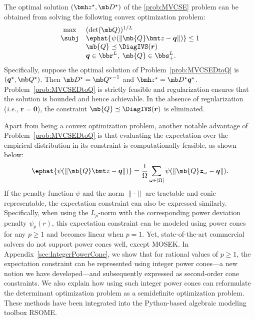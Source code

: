 \documentclass[mnsc, nonblindrev]{informswp}
\newcommand{\1}[1]{\mathds{1}{\left(#1\right)}}
\begin{document}
\begin{theorem}
\label{chap8:thm:MinimumVolumeDtoQ}
The optimal solution $(\bmh z^\star, \mb D^\star)$ of the \ref{prob:MVCSE} problem can be obtained from solving the following convex optimization problem:
\begin{equation}
\label{prob:MVCSEDtoQ}
\begin{array}{cll}
\max & (\det(\mb Q))^{1/L} \\
\subj & \ephat{\psi(\|\mb{Q} \bmt z - \bm q \|)} \leq 1 \\
& \mb{Q} \preceq \DiagIVS(\bm r) \\
& \bm q \in \bbr^L, \; \mb{Q} \in \bbs^{L}_{+}.  
\end{array} 
\end{equation}
Specifically, suppose the optimal solution of Problem~\eqref{prob:MVCSEDtoQ} is $(\bm q^\star,\mb Q^\star)$. Then $\mb D^\star = {\mb Q^\star}^{-1}$ and $\bmh z^\star = \mb D^\star \bm q^\star$. Problem~\eqref{prob:MVCSEDtoQ} is strictly feasible and regularization ensures that the solution is bounded and hence achievable. In the absence of regularization (\textit{i.e.}, $\bm r =\bm 0$), the constraint $\mb{Q} \preceq \DiagIVS(\bm r)$ is eliminated.    
\end{theorem}



Apart from being a convex optimization problem, another notable advantage of Problem~\eqref{prob:MVCSEDtoQ} is that evaluating the expectation over the empirical distribution in its constraint is computationally feasible, as shown below:
$$
\ephat{\psi(\|\mb{Q} \bmt z - \bm q \|)} = \frac{1}{\Omega} \sum_{\omega \in [\Omega]} \psi(\|\mb{Q} \bm z_\omega - \bm q \|). 
$$
If the penalty function $\psi$ and the norm $\|\cdot\|$ are tractable and conic representable, the expectation constraint can also be expressed similarly. Specifically, when using the $L_p$-norm with the corresponding power deviation penalty $\psi_p(r)$, this expectation constraint can be modeled using power cones for any $p \geq 1$ and becomes linear when $p = 1$. Yet, state-of-the-art commercial solvers do not support power cones well, except MOSEK. In Appendix~\ref{sec:IntegerPowerCone}, we show that for rational values of \(p \geq 1\), the expectation constraint can be represented using integer power cones---a new notion we have developed---and subsequently expressed as second-order cone constraints. We also explain how using such integer power cones can reformulate the determinant optimization problem as a semidefinite optimization problem. These methods have been integrated into the Python-based algebraic modeling toolbox RSOME.
\end{document}

